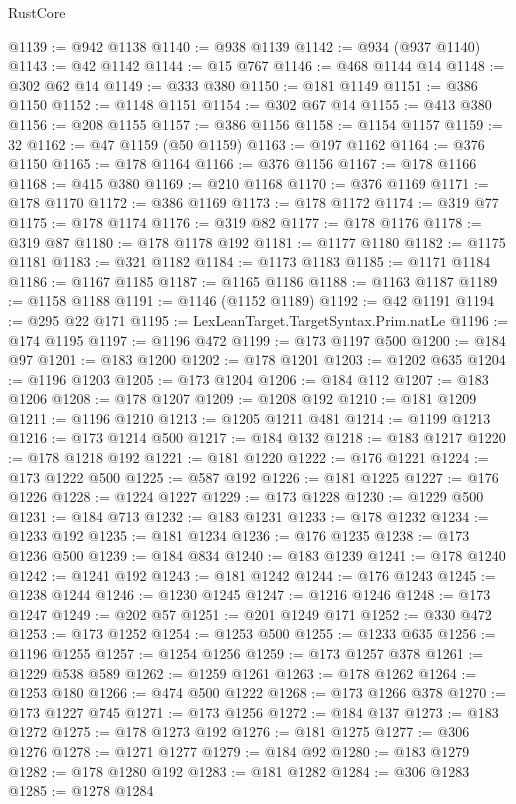 \begin{lexlean}{RustCore}
\begin{coremodule}
@1139 := @942 @1138
@1140 := @938 @1139
@1142 := @934 (@937 @1140)
@1143 := @42 @1142
@1144 := @15 @767
@1146 := @468 @1144 @14
@1148 := @302 @62 @14
@1149 := @333 @380
@1150 := @181 @1149
@1151 := @386 @1150
@1152 := @1148 @1151
@1154 := @302 @67 @14
@1155 := @413 @380
@1156 := @208 @1155
@1157 := @386 @1156
@1158 := @1154 @1157
@1159 := 32
@1162 := @47 @1159 (@50 @1159)
@1163 := @197 @1162
@1164 := @376 @1150
@1165 := @178 @1164
@1166 := @376 @1156
@1167 := @178 @1166
@1168 := @415 @380
@1169 := @210 @1168
@1170 := @376 @1169
@1171 := @178 @1170
@1172 := @386 @1169
@1173 := @178 @1172
@1174 := @319 @77
@1175 := @178 @1174
@1176 := @319 @82
@1177 := @178 @1176
@1178 := @319 @87
@1180 := @178 @1178 @192
@1181 := @1177 @1180
@1182 := @1175 @1181
@1183 := @321 @1182
@1184 := @1173 @1183
@1185 := @1171 @1184
@1186 := @1167 @1185
@1187 := @1165 @1186
@1188 := @1163 @1187
@1189 := @1158 @1188
@1191 := @1146 (@1152 @1189)
@1192 := @42 @1191
@1194 := @295 @22 @171
@1195 := LexLeanTarget.TargetSyntax.Prim.natLe
@1196 := @174 @1195
@1197 := @1196 @472
@1199 := @173 @1197 @500
@1200 := @184 @97
@1201 := @183 @1200
@1202 := @178 @1201
@1203 := @1202 @635
@1204 := @1196 @1203
@1205 := @173 @1204
@1206 := @184 @112
@1207 := @183 @1206
@1208 := @178 @1207
@1209 := @1208 @192
@1210 := @181 @1209
@1211 := @1196 @1210
@1213 := @1205 @1211 @481
@1214 := @1199 @1213
@1216 := @173 @1214 @500
@1217 := @184 @132
@1218 := @183 @1217
@1220 := @178 @1218 @192
@1221 := @181 @1220
@1222 := @176 @1221
@1224 := @173 @1222 @500
@1225 := @587 @192
@1226 := @181 @1225
@1227 := @176 @1226
@1228 := @1224 @1227
@1229 := @173 @1228
@1230 := @1229 @500
@1231 := @184 @713
@1232 := @183 @1231
@1233 := @178 @1232
@1234 := @1233 @192
@1235 := @181 @1234
@1236 := @176 @1235
@1238 := @173 @1236 @500
@1239 := @184 @834
@1240 := @183 @1239
@1241 := @178 @1240
@1242 := @1241 @192
@1243 := @181 @1242
@1244 := @176 @1243
@1245 := @1238 @1244
@1246 := @1230 @1245
@1247 := @1216 @1246
@1248 := @173 @1247
@1249 := @202 @57
@1251 := @201 @1249 @171
@1252 := @330 @472
@1253 := @173 @1252
@1254 := @1253 @500
@1255 := @1233 @635
@1256 := @1196 @1255
@1257 := @1254 @1256
@1259 := @173 @1257 @378
@1261 := @1229 @538 @589
@1262 := @1259 @1261
@1263 := @178 @1262
@1264 := @1253 @180
@1266 := @474 @500 @1222
@1268 := @173 @1266 @378
@1270 := @173 @1227 @745
@1271 := @173 @1256
@1272 := @184 @137
@1273 := @183 @1272
@1275 := @178 @1273 @192
@1276 := @181 @1275
@1277 := @306 @1276
@1278 := @1271 @1277
@1279 := @184 @92
@1280 := @183 @1279
@1282 := @178 @1280 @192
@1283 := @181 @1282
@1284 := @306 @1283
@1285 := @1278 @1284

\end{coremodule}
\end{lexlean}
